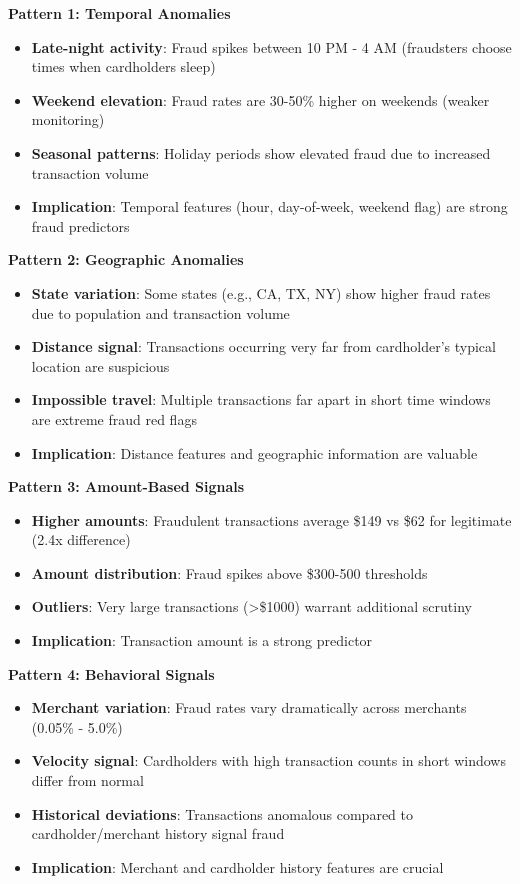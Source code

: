 \textbf{Pattern 1: Temporal Anomalies}
\begin{itemize}
    \item \textbf{Late-night activity}: Fraud spikes between 10 PM - 4 AM (fraudsters choose times when cardholders sleep)
    \item \textbf{Weekend elevation}: Fraud rates are 30-50\% higher on weekends (weaker monitoring)
    \item \textbf{Seasonal patterns}: Holiday periods show elevated fraud due to increased transaction volume
    \item \textbf{Implication}: Temporal features (hour, day-of-week, weekend flag) are strong fraud predictors
\end{itemize}

\textbf{Pattern 2: Geographic Anomalies}
\begin{itemize}
    \item \textbf{State variation}: Some states (e.g., CA, TX, NY) show higher fraud rates due to population and transaction volume
    \item \textbf{Distance signal}: Transactions occurring very far from cardholder's typical location are suspicious
    \item \textbf{Impossible travel}: Multiple transactions far apart in short time windows are extreme fraud red flags
    \item \textbf{Implication}: Distance features and geographic information are valuable
\end{itemize}

\textbf{Pattern 3: Amount-Based Signals}
\begin{itemize}
    \item \textbf{Higher amounts}: Fraudulent transactions average \$149 vs \$62 for legitimate (2.4x difference)
    \item \textbf{Amount distribution}: Fraud spikes above \$300-500 thresholds
    \item \textbf{Outliers}: Very large transactions (>\$1000) warrant additional scrutiny
    \item \textbf{Implication}: Transaction amount is a strong predictor
\end{itemize}

\textbf{Pattern 4: Behavioral Signals}
\begin{itemize}
    \item \textbf{Merchant variation}: Fraud rates vary dramatically across merchants (0.05\% - 5.0\%)
    \item \textbf{Velocity signal}: Cardholders with high transaction counts in short windows differ from normal
    \item \textbf{Historical deviations}: Transactions anomalous compared to cardholder/merchant history signal fraud
    \item \textbf{Implication}: Merchant and cardholder history features are crucial
\end{itemize}

